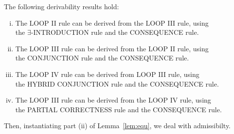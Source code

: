 \documentclass[manuscript, screen, review]{acmart}
\begin{document}
\begin{lemma}[Derivability]
  \label{lem:derivability}
The following derivability results hold:

\begin{enumerate} [(i)]
   \item The {\rm LOOP II} rule can be derived from the {\rm LOOP III} rule, using \\
   the  $\exists$-{\rm INTRODUCTION} rule and the {\rm CONSEQUENCE} rule.
   
    \vspace{2mm}

   \item The {\rm LOOP III} rule can be derived from the {\rm LOOP II} rule, using \\
   the {\rm CONJUNCTION} rule and the {\rm CONSEQUENCE} rule.
   
    \vspace{2mm}

   \item The {\rm LOOP IV} rule can be derived from {\rm LOOP III} rule, using \\
   the  {\rm HYBRID CONJUNCTION} rule and the {\rm CONSEQUENCE} rule.
   
    \vspace{2mm}

   \item The {\rm LOOP III} rule can be derived from the {\rm LOOP IV} rule, using \\
   the {\rm PARTIAL CORRECTNESS} rule and the {\rm CONSEQUENCE} rule.
   

   

   
\end{enumerate}

\end{lemma}

Then, instantiating part (ii) of Lemma~\ref{lem:equ}, we deal with admissibilty.
\end{document}
